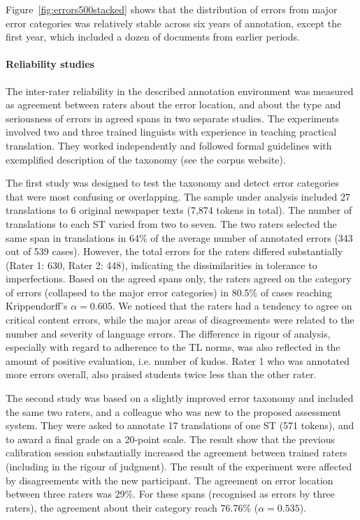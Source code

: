 Figure~\ref{fig:errors500stacked} shows that the distribution of errors from major error categories was relatively stable across six years of annotation, except the first year, which included a dozen of documents from earlier periods. 


\paragraph{Reliability studies}
The inter-rater reliability in the described annotation environment was measured as agreement between raters about the error location, and about the type and seriousness of errors in agreed spans in two separate studies. The experiments involved two and three trained linguists with experience in teaching practical translation. They worked independently and followed formal guidelines with exemplified description of the taxonomy (see the corpus website).

The first study was designed to test the taxonomy and detect error categories that were most confusing or overlapping. The sample under analysis included 27 translations to 6 original newspaper texts (7,874 tokens in total). The number of translations to each ST varied from two to seven.
The two raters selected the same span in translations in 64\% of the average number of annotated errors (343 out of 539 cases). However, the total errors for the raters differed substantially (Rater 1: 630, Rater 2: 448), indicating the dissimilarities in tolerance to imperfections. 
Based on the agreed spans only, the raters agreed on the category of errors (collapsed to the major error categories) in 80.5\% of cases reaching Krippendorff's $\alpha=0.605$. %
We noticed that the raters had a tendency to agree on critical content errors, while the major areas of disagreements were related to the number and severity of language errors. The difference in rigour of analysis, especially with regard to adherence to the TL norms, was also reflected in the amount of positive evaluation, i.e. number of kudos. Rater 1 who was annotated more errors overall, also praised students twice less than the other rater. 

The second study was based on a slightly improved error taxonomy and included the same two raters, and a colleague who was new to the proposed assessment system. They were asked to annotate 17 translations of one ST (571 tokens), and to award a final grade on a 20-point scale. The result show that the previous calibration session substantially increased the agreement between trained raters (including in the rigour of judgment). The result of the experiment were affected by disagreements with the new participant. The agreement on error location between three raters was 29\%. For these spans (recognised as errors by three raters), the agreement about their category reach 76.76\% ($\alpha=0.535$).


